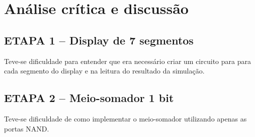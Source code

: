 \chapter{Análise crítica e discussão}
	\section{ETAPA 1 – Display de 7 segmentos}
		Teve-se dificuldade para entender que era necessário criar um circuito
		para para cada segmento do display e na leitura do resultado da simulação.
	\section{ETAPA 2 – Meio-somador 1 bit}
		Teve-se dificuldade de como implementar o meio-somador utilizando apenas as portas NAND.



